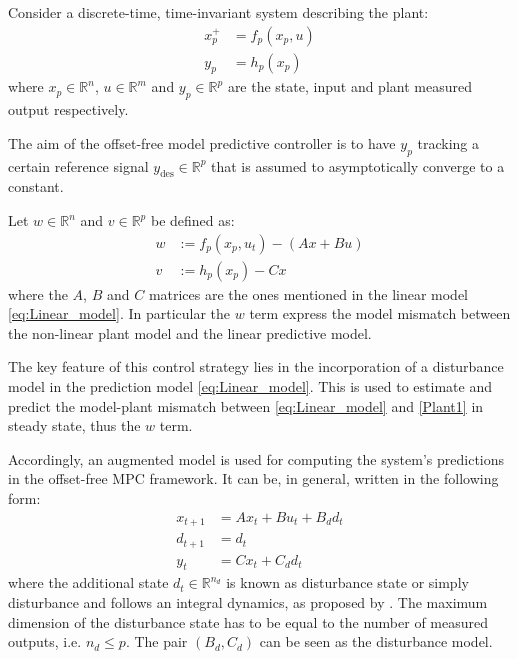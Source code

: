 \documentclass[a4paper,12pt,oneside]{book}
\begin{document}
\bigskip
Consider a discrete-time, time-invariant system describing the plant:
\begin{equation}
\begin{aligned}
    x_p^+ &= f_p (x_p, u) \\
    y_p &= h_p (x_p) 
\end{aligned}
\label{Plant1}
\end{equation}
where $x_p \in \mathbb{R}^n$, $u \in \mathbb{R}^m$ and $y_p \in \mathbb{R}^p$ are the state, input and plant measured output respectively. 

The aim of the offset-free model predictive controller is to have $y_p$ tracking a certain reference signal $y_{\text{des}} \in \mathbb{R}^p$ that is assumed to asymptotically converge to a constant.

\bigskip
Let $w \in \mathbb{R}^n$ and $v \in \mathbb{R}^p$ be defined as:
\begin{equation}
\begin{aligned}
    w & := f_p (x_p, u_t) - (A x + Bu) \\
    v & := h_p (x_p) - C x
\end{aligned}
\label{Plant_model_mismatch}
\end{equation}
where the $A$, $B$ and $C$ matrices are the ones mentioned in the linear model \ref{eq:Linear_model}. In particular the $w$ term express the model mismatch between the non-linear plant model and the linear predictive model.

\bigskip
The key feature of this control strategy lies in the incorporation of a disturbance model in the prediction model \ref{eq:Linear_model}.
This is used to estimate and predict the model-plant mismatch between \ref{eq:Linear_model} and \ref{Plant1} in steady state, thus the $w$ term. 

\bigskip
Accordingly, an augmented model is used for computing the system's predictions in the offset-free MPC framework. 
It can be, in general, written in the following form:
\begin{equation}
\begin{aligned}
    x_{t+1} &= A x_t + B u_t + B_d d_t \\
    d_{t+1} &= d_t \\
    y_t &= C x_t + C_d d_t
\end{aligned}
\label{Augmented_model}
\end{equation}
where the additional state $d_t \in \mathbb{R}^{n_d}$ is known as disturbance state or simply disturbance and follows an integral dynamics, as proposed by \cite{pannocchia2003disturbance}. 
The maximum dimension of the disturbance state has to be equal to the number of measured outputs, i.e. $n_d \leq p$.
The pair $(B_d, C_d)$ can be seen as the disturbance model.
\end{document}
